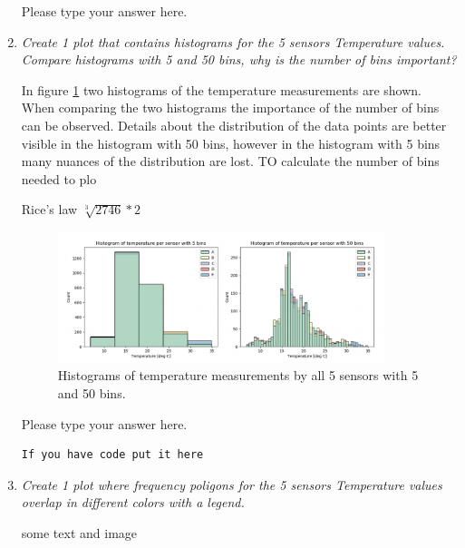 \documentclass[a4paper,12pt]{article} %
\begin{document}
\begin{enumerate}
Please type your answer here.

\item {\it Create 1 plot that contains histograms for the 5 sensors Temperature values. Compare histograms with 5 and 50 bins, why is the number of bins important?}

In figure \ref{fig:hist5and50} two histograms of the temperature measurements are shown. When comparing the two histograms the importance of the number of bins can be observed. Details about the distribution of the data points are better visible in the histogram with 50 bins, however in the histogram with 5 bins many nuances of the distribution are lost. 
TO calculate the number of bins needed to plo





Rice's law $\sqrt[3]{{2746}} * 2 $

 \begin{figure}[H] 
    \centering
    \includegraphics[width=0.9\textwidth]{HIstograms 50 and 5 bins.png} 
    \caption{Histograms of temperature measurements by all 5 sensors with 5 and 50 bins.} %
    \label{fig:hist5and50}
  \end{figure}

Please type your answer here.

\begin{verbatim}
If you have code put it here
\end{verbatim}

\item {\it Create 1 plot where frequency poligons for the 5 sensors Temperature values overlap in different colors with a legend.}

some text and image 


\end{enumerate}
\end{document}
